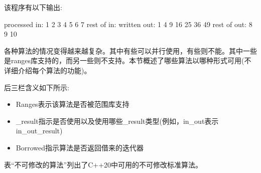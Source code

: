 该程序有以下输出:

\begin{shell}
processed in: 1 2 3 4 5 6 7
rest of in:
written out: 1 4 9 16 25 36 49
rest of out: 8 9 10
\end{shell}


各种算法的情况变得越来越复杂。其中有些可以并行使用，有些则不能。其中一些是ranges库支持的，而另一些则不支持。本节概述了哪些算法以哪种形式可用(不详细介绍每个算法的功能)。

后三栏含义如下所示:

\begin{itemize}
\item
Ranges表示该算法是否被范围库支持

\item
\_result指示是否使用以及使用哪些\_result类型(例如，in\_out表示in\_out\_result)

\item
Borrowed指示算法是否返回借来的迭代器
\end{itemize}

表“不可修改的算法”列出了C++20中可用的不可修改标准算法。

